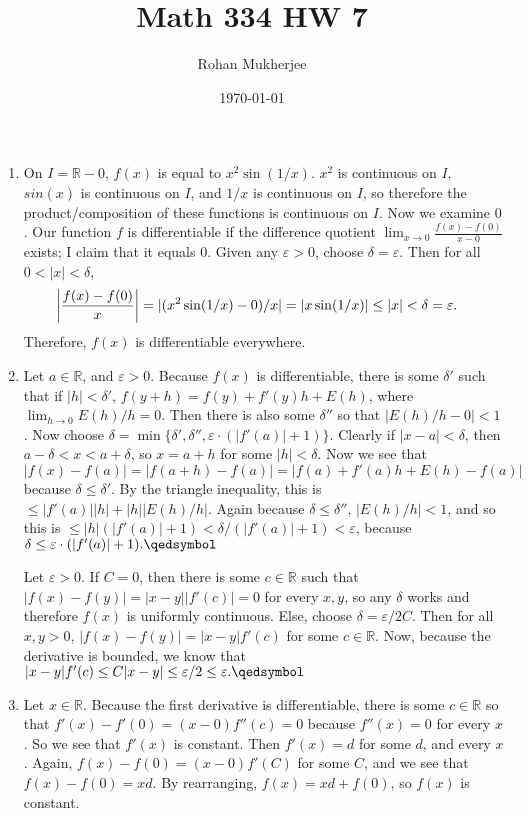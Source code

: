 \documentclass[12pt]{article}
\title{Math 334 HW 7}
\date{\today}
\author{Rohan Mukherjee}
\theoremstyle{definition}
\theoremstyle{remark}
\newcommand{\R}{\mathbb{R}}
\newcommand{\ve}{\varepsilon}
\renewcommand{\qed}{\hfill\qedsymbol}
\begin{document}
	\maketitle
	\begin{enumerate}[leftmargin=\labelsep]
		\item 
		On $I = \R - 0$, $f(x)$ is equal to $x^2\sin(1/x)$. $x^2$ is continuous on $I$, $sin(x)$ is continuous on $I$, and $1/x$ is continuous on $I$, so therefore the product/composition of these functions is continuous on $I$. Now we examine $0$. Our function $f$ is differentiable if the difference quotient $\lim_{x \to 0} \frac{f(x)-f(0)}{x-0}$ exists; I claim that it equals 0. Given any $\ve > 0$, choose $\delta = \ve$. Then for all $0<|x|<\delta$,
		\begin{align*}
			\qty|\frac{f(x)-f(0)}{x}| &= |(x^2\sin(1/x)-0)/x| = |x\sin(1/x)| \leq |x| < \delta = \ve.
		\end{align*}
		Therefore, $f(x)$ is differentiable everywhere.
		
		\item
		Let $a \in \R$, and $\ve > 0$. Because $f(x)$ is differentiable, there is some $\delta'$ such that if $|h| < \delta'$, $f(y+h)=f(y)+f'(y)h+E(h)$, where $\lim_{h\to 0} E(h)/h = 0$. Then there is also some $\delta''$ so that $|E(h)/h - 0| < 1$. Now choose $\delta = \min\{\delta', \delta'', \ve \cdot (|f'(a)|+1)\}$. Clearly if $|x-a| < \delta$, then $a-\delta < x < a+\delta$, so $x = a+h$ for some $|h| < \delta$. Now we see that $|f(x)-f(a)| = |f(a+h)-f(a)| = |f(a)+f'(a)h+E(h)-f(a)|$ because $\delta \leq \delta'$. By the triangle inequality, this is $\leq |f'(a)||h|+|h||E(h)/h|$. Again because $\delta \leq \delta''$, $|E(h)/h| < 1$, and so this is $\leq |h|(|f'(a)|+1) < \delta/(|f'(a)|+1) < \ve$, because $\delta \leq \ve \cdot (|f'(a)|+1). \qed$
				
				Let $\ve > 0$. If $C = 0$, then there is some $c \in \R$ such that $|f(x)-f(y)|=|x-y||f'(c)|=0$ for every $x, y$, so any $\delta$ works and therefore $f(x)$ is uniformly continuous. Else, choose $\delta = \ve/2C$. Then for all $x, y > 0$, $|f(x)-f(y)| = |x-y|f'(c)$ for some $c \in \R$. Now, because the derivative is bounded, we know that $|x-y|f'(c) \leq C|x-y| \leq \ve/2 \leq \ve. \qed$
		
		\item 
		Let $x \in \R$. Because the first derivative is differentiable, there is some $c \in \R$ so that $f'(x)-f'(0)=(x-0)f''(c) = 0$ because $f''(x)=0$ for every $x$. So we see that $f'(x)$ is constant. Then $f'(x)=d$ for some $d$, and every $x$. Again, $f(x)-f(0)=(x-0)f'(C)$ for some $C$, and we see that $f(x)-f(0) = xd$. By rearranging, $f(x)=xd+f(0)$, so $f(x)$ is constant.
		

\end{enumerate}
\end{document}
